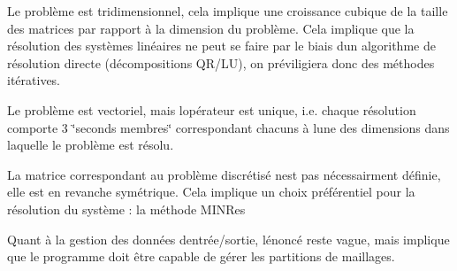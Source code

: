 \begin{DoxyItemize}
\item Le problème est tridimensionnel, cela implique une croissance cubique de la taille des matrices par rapport à la dimension du problème. Cela implique que la résolution des systèmes linéaires ne peut se faire par le biais d\textquotesingle{}un algorithme de résolution directe (décompositions Q\+R/\+LU), on préviligiera donc des méthodes itératives.
\item Le problème est vectoriel, mais l\textquotesingle{}opérateur est unique, i.\+e. chaque résolution comporte 3 \char`\"{}seconds membres\char`\"{} correspondant chacuns à l\textquotesingle{}une des dimensions dans laquelle le problème est résolu.
\item La matrice correspondant au problème discrétisé n\textquotesingle{}est pas nécessairment définie, elle est en revanche symétrique. Cela implique un choix préférentiel pour la résolution du système \+: la méthode M\+I\+N\+Res
\item Quant à la gestion des données d\textquotesingle{}entrée/sortie, l\textquotesingle{}énoncé reste vague, mais implique que le programme doit être capable de gérer les partitions de maillages. 
\end{DoxyItemize}